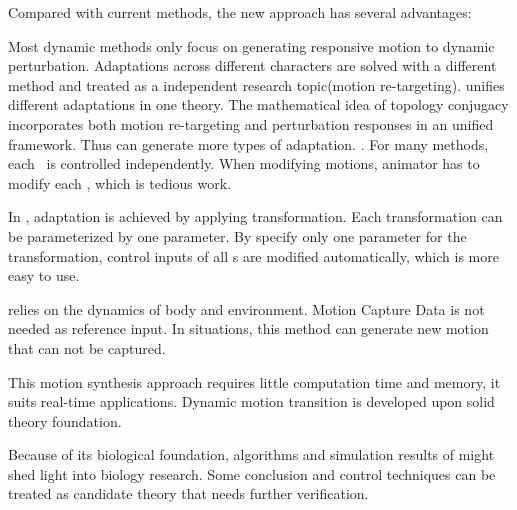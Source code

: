 Compared with current \cms methods, the new approach has several advantages:
\begin{enumerate}
Most dynamic methods only focus on generating responsive motion to dynamic perturbation.
Adaptations across different characters are solved with a different method and treated as a independent research topic(motion re-targeting).
\moit unifies different  adaptations in one theory.
The mathematical idea of topology conjugacy  incorporates both motion re-targeting and  perturbation responses  in an unified framework.
Thus \moit can generate more types of adaptation.
.
For many \cms methods, each \dof ~is controlled independently.
When modifying motions, animator has to modify each \dof, which is tedious work.

In \moit, adaptation is achieved by applying transformation.
Each transformation can be parameterized by one parameter. 
By specify only one parameter for the transformation, control inputs of all {\dof}s are modified automatically, which is more easy to use.

\moit relies on the dynamics of body and environment.
Motion Capture Data is not needed as reference input.
In situations, this method can generate new motion that can not be captured.


This motion synthesis approach requires little computation time and memory, it suits real-time applications.
Dynamic motion transition is developed upon solid theory foundation.

\end{enumerate}

Because of its biological foundation,
algorithms and simulation results of \moit  might shed light into biology research.
Some conclusion and control techniques can be treated as candidate theory that needs further verification.

